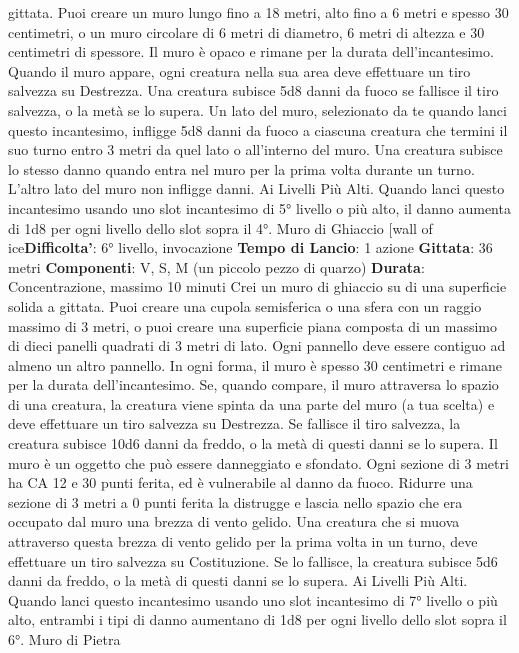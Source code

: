 \begin{multicols}{2}
gittata. Puoi creare un muro lungo fino a 18 metri, alto
fino a 6 metri e spesso 30 centimetri, o un muro
circolare di 6 metri di diametro, 6 metri di altezza e 30
centimetri di spessore. Il muro è opaco e rimane per la
durata dell’incantesimo.
Quando il muro appare, ogni creatura nella sua area
deve effettuare un tiro salvezza su Destrezza. Una
creatura subisce 5d8 danni da fuoco se fallisce il tiro
salvezza, o la metà se lo supera.
Un lato del muro, selezionato da te quando lanci questo
incantesimo, infligge 5d8 danni da fuoco a ciascuna
creatura che termini il suo turno entro 3 metri da quel
lato o all’interno del muro. Una creatura subisce lo
stesso danno quando entra nel muro per la prima volta
durante un turno. L’altro lato del muro non infligge
danni.
Ai Livelli Più Alti. Quando lanci questo incantesimo
usando uno slot incantesimo di 5° livello o più alto, il
danno aumenta di 1d8 per ogni livello dello slot sopra il
4°.
Muro di Ghiaccio
[wall of ice\textbf{Difficolta'}:
6° livello, invocazione
\textbf{Tempo di Lancio}: 1 azione
\textbf{Gittata}: 36 metri
\textbf{Componenti}: V, S, M (un piccolo pezzo di quarzo)
\textbf{Durata}: Concentrazione, massimo 10 minuti
Crei un muro di ghiaccio su di una superficie solida a
gittata. Puoi creare una cupola semisferica o una sfera
con un raggio massimo di 3 metri, o puoi creare una
superficie piana composta di un massimo di dieci
panelli quadrati di 3 metri di lato. Ogni pannello deve
essere contiguo ad almeno un altro pannello. In ogni
forma, il muro è spesso 30 centimetri e rimane per la
durata dell’incantesimo.
Se, quando compare, il muro attraversa lo spazio di una
creatura, la creatura viene spinta da una parte del muro
(a tua scelta) e deve effettuare un tiro salvezza su
Destrezza. Se fallisce il tiro salvezza, la creatura
subisce 10d6 danni da freddo, o la metà di questi danni
se lo supera.
Il muro è un oggetto che può essere danneggiato e
sfondato. Ogni sezione di 3 metri ha CA 12 e 30 punti
ferita, ed è vulnerabile al danno da fuoco. Ridurre una
sezione di 3 metri a 0 punti ferita la distrugge e lascia
nello spazio che era occupato dal muro una brezza di
vento gelido. Una creatura che si muova attraverso
questa brezza di vento gelido per la prima volta in un
turno, deve effettuare un tiro salvezza su Costituzione.
Se lo fallisce, la creatura subisce 5d6 danni da freddo,
o la metà di questi danni se lo supera.
Ai Livelli Più Alti. Quando lanci questo incantesimo
usando uno slot incantesimo di 7° livello o più alto,
entrambi i tipi di danno aumentano di 1d8 per ogni
livello dello slot sopra il 6°.
Muro di Pietra

\end{multicols}
